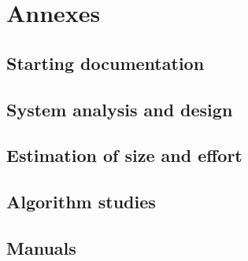 \renewcommand{\documentname}{Annexes}

\chapter{Annexes}

\section{Starting documentation}
\section{System analysis and design}
\section{Estimation of size and effort}
\section{Algorithm studies}\label{alg-studies}
\section{Manuals}


